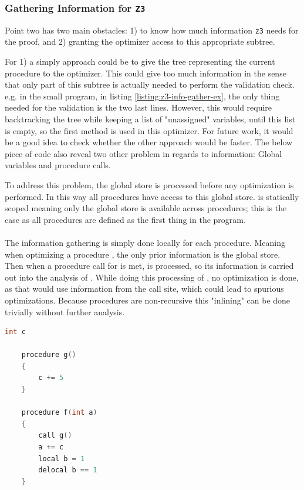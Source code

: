 \subsubsection{Gathering Information for \texttt{Z3} \rr}
Point two has two main obstacles: 1) to know how much information \texttt{z3} needs for the proof,
and 2) granting the optimizer access to this appropriate subtree.

For 1) a simply approach could be to give the tree representing the current procedure to the
optimizer. This could give too much information in the sense that only part of this subtree is
actually needed to perform the validation check. e.g. in the small program, in listing
\ref{listing:z3-info-gather-ex}, the only thing
needed for the validation is the two last lines. However, this would require backtracking the
tree while keeping a list of "unassigned" variables, until this list is empty, so the first
method is used in this optimizer. For future work, it would be a good idea to check whether the
other approach would be faster. The below piece of code also reveal two other problem in regards
to information: Global variables and procedure calls.

To address this problem, the global store is processed before any optimization is performed.
In this way all procedures have access to this global store. \lan is statically scoped meaning
only the global store is available across procedures; this is the case as all procedures are
defined as the first thing in the program.
\\
\\
The information gathering is simply done locally for each procedure. Meaning when optimizing
a procedure , the only prior information is the global store. Then when a procedure
call for  is met,  is processed, so its information is carried out into
the analysis of . While doing this processing of , no optimization is done,
as that would use information from the call site, which could lead to spurious optimizations.
Because procedures are non-recursive this "inlining" can be done trivially without further
analysis.

\begin{lstlisting}[language=C++, label=listing:z3-info-gather-ex,
    caption=Example on gathering information for \texttt{z3} where only last two lines are needed.]
    int c

    procedure g()
    {
        c += 5
    }

    procedure f(int a)
    {
        call g()
        a += c
        local b = 1
        delocal b == 1
    }
\end{lstlisting}

